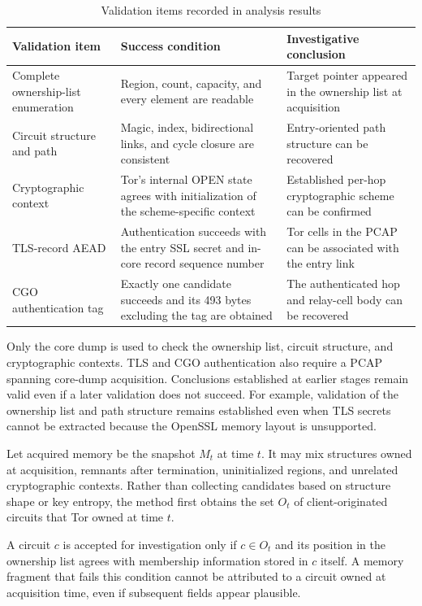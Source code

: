 \documentclass[10pt,a4paper]{article}
\begin{document}
\begin{table}[!tbp]
\centering
\caption{Validation items recorded in analysis results}
\label{tab:evidence-levels}
\small
\begin{tabularx}{\linewidth}{L{34mm}Y Y}
\toprule
Validation item & Success condition & Investigative conclusion \\
\midrule
Complete ownership-list enumeration & Region, count, capacity, and every element are readable & Target pointer appeared in the ownership list at acquisition \\
Circuit structure and path & Magic, index, bidirectional links, and cycle closure are consistent & Entry-oriented path structure can be recovered \\
Cryptographic context & Tor's internal OPEN state agrees with initialization of the scheme-specific context & Established per-hop cryptographic scheme can be confirmed \\
TLS-record AEAD & Authentication succeeds with the entry SSL secret and in-core record sequence number & Tor cells in the PCAP can be associated with the entry link \\
CGO authentication tag & Exactly one candidate succeeds and its 493 bytes excluding the tag are obtained & The authenticated hop and relay-cell body can be recovered \\
\bottomrule
\end{tabularx}
\end{table}

Only the core dump is used to check the ownership list, circuit structure, and cryptographic contexts. TLS and CGO authentication also require a PCAP spanning core-dump acquisition. Conclusions established at earlier stages remain valid even if a later validation does not succeed. For example, validation of the ownership list and path structure remains established even when TLS secrets cannot be extracted because the OpenSSL memory layout is unsupported.


Let acquired memory be the snapshot $M_t$ at time $t$. It may mix structures owned at acquisition, remnants after termination, uninitialized regions, and unrelated cryptographic contexts. Rather than collecting candidates based on structure shape or key entropy, the method first obtains the set $O_t$ of client-originated circuits that Tor owned at time $t$.

A circuit $c$ is accepted for investigation only if $c\in O_t$ and its position in the ownership list agrees with membership information stored in $c$ itself. A memory fragment that fails this condition cannot be attributed to a circuit owned at acquisition time, even if subsequent fields appear plausible.
\end{document}
